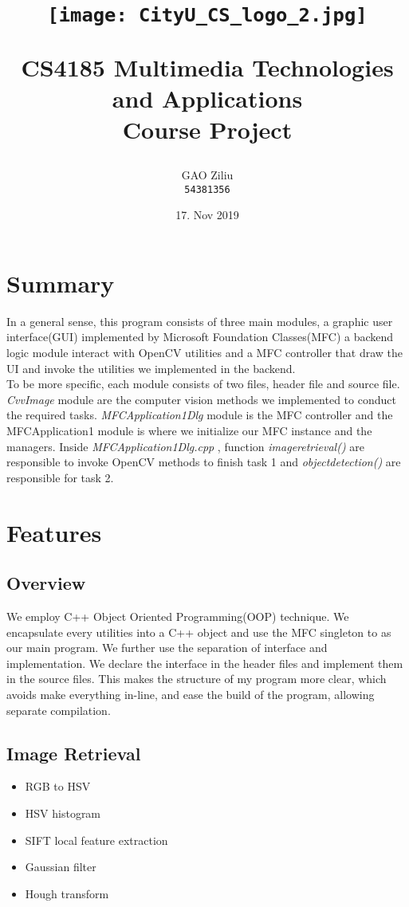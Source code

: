 \documentclass[12pt]{article}
\title{
\centerline{\texttt{[image: CityU\_CS\_logo\_2.jpg]}}
\vspace{0.5 cm}
CS4185 Multimedia Technologies and Applications\\
Course Project
\large  \\
  }
\author{
    GAO Ziliu\\
    \texttt{54381356}
}
\date{17. Nov 2019}
\begin{document}
\maketitle
\clearpage


\section*{Summary}
In a general sense, this program consists of three main modules, a graphic user interface(GUI) implemented by Microsoft Foundation Classes(MFC) a backend logic module interact with OpenCV utilities and a MFC controller that draw the UI and invoke the utilities we implemented in the backend.\\

To be more specific, each module consists of two files, header file and source file. \textit{CvvImage} module are the computer vision methods we implemented to conduct the required tasks. \textit{MFCApplication1Dlg} module is the MFC controller and the {MFCApplication1} module is where we initialize our MFC instance and the managers. Inside \textit{MFCApplication1Dlg.cpp} , function \textit{imageretrieval()} are responsible to invoke OpenCV methods to finish task 1 and \textit{objectdetection()}  are responsible for task 2.\\

\section*{Features}
\subsection*{Overview}
We employ C++ Object Oriented Programming(OOP) technique. We encapsulate every utilities into a C++ object and use the MFC singleton to as our main program. We further use  the separation of interface and implementation. We declare the interface in the header files and implement them in the source files. This makes the structure of my program more clear, which avoids make  everything in-line, and ease the build of the program, allowing separate compilation.\\

\subsection*{Image Retrieval}
\begin{itemize}
  \item RGB to HSV
  \item HSV histogram
  \item SIFT local feature extraction
  \item Gaussian filter
  \item Hough transform
\end{itemize}
\end{document}
